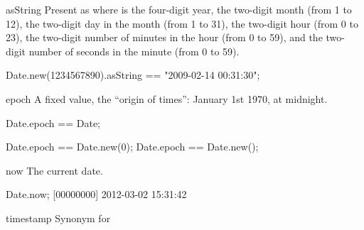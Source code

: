 \begin{urbiscriptapi}
\item[asString]
  Present as  where  is the four-digit
  year,  the two-digit month (from 1 to 12),  the
  two-digit day in the month (from 1 to 31),  the two-digit
  hour (from 0 to 23),  the two-digit number of minutes in the
  hour (from 0 to 59), and  the two-digit number of seconds in
  the minute (from 0 to 59).
\begin{urbiassert}
Date.new(1234567890).asString == "2009-02-14 00:31:30";
\end{urbiassert}

\item[epoch]
  A fixed value, the ``origin of times'': January 1st 1970, at
  midnight.
\begin{urbiassert}
Date.epoch == Date;

Date.epoch == Date.new(0);
Date.epoch == Date.new();
\end{urbiassert}

\item[now] The current date.
\begin{urbiunchecked}
Date.now;
[00000000] 2012-03-02 15:31:42
\end{urbiunchecked}

\item[timestamp] Synonym for 

\end{urbiscriptapi}


